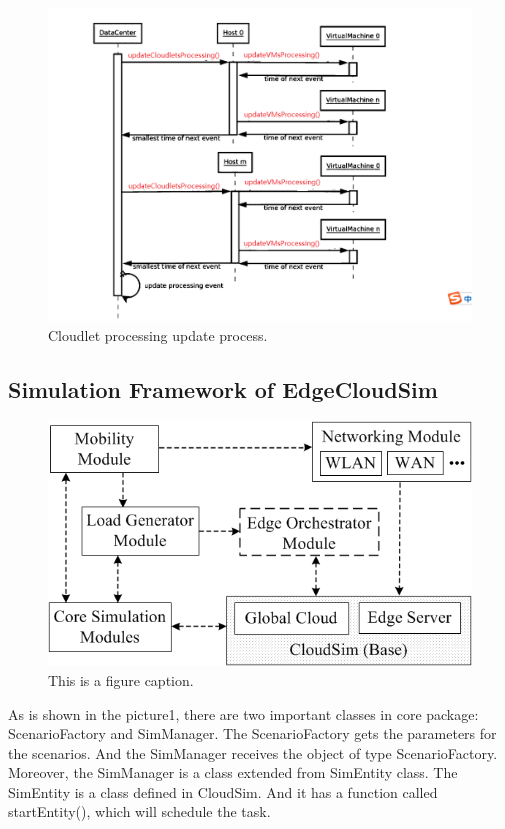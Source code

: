 \begin{figure}
	\centering
	\includegraphics[width=1\textwidth]{./figures/3-processingSequence.png}
	\caption{\label{fig:processingSequence}Cloudlet processing update process.}
\end{figure}

\subsection{Simulation Framework of EdgeCloudSim}
\begin{figure}
	\centering
	\includegraphics[width=1\textwidth]{./figures/1-edgecloudsim_diagram.png}
	\caption{\label{fig:frog}This is a figure caption.}
\end{figure}

As is shown in the picture1, there are two important classes in core package: ScenarioFactory and SimManager. The ScenarioFactory gets the parameters for the scenarios. And the SimManager receives the object of type ScenarioFactory. Moreover, the SimManager is a class extended from SimEntity class. The SimEntity is a class defined in CloudSim. And it has a function called startEntity(), which will schedule the task. 

